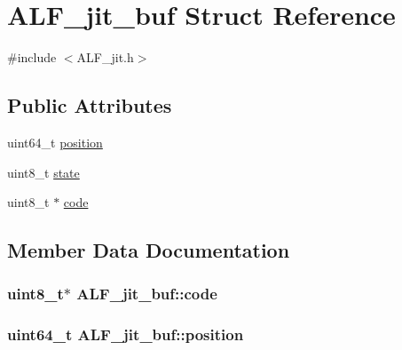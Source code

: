 \hypertarget{structALF__jit__buf}{}\section{A\+L\+F\+\_\+jit\+\_\+buf Struct Reference}
\label{structALF__jit__buf}


{\ttfamily \#include $<$A\+L\+F\+\_\+jit.\+h$>$}

\subsection*{Public Attributes}
\begin{DoxyCompactItemize}
\item 
uint64\+\_\+t \hyperlink{structALF__jit__buf_a6a35d3d3e3a0033c118119bdec30df10}{position}
\item 
uint8\+\_\+t \hyperlink{structALF__jit__buf_a6c8c4d0af0f8cc06d141f6babe8236b6}{state}
\item 
uint8\+\_\+t $\ast$ \hyperlink{structALF__jit__buf_acc94d6814de68a2c11e60ea2ae924385}{code}
\end{DoxyCompactItemize}


\subsection{Member Data Documentation}
\subsubsection[{\texorpdfstring{code}{code}}]{\setlength{\rightskip}{0pt plus 5cm}uint8\+\_\+t$\ast$ A\+L\+F\+\_\+jit\+\_\+buf\+::code}\hypertarget{structALF__jit__buf_acc94d6814de68a2c11e60ea2ae924385}{}\label{structALF__jit__buf_acc94d6814de68a2c11e60ea2ae924385}
\subsubsection[{\texorpdfstring{position}{position}}]{\setlength{\rightskip}{0pt plus 5cm}uint64\+\_\+t A\+L\+F\+\_\+jit\+\_\+buf\+::position}\hypertarget{structALF__jit__buf_a6a35d3d3e3a0033c118119bdec30df10}{}\label{structALF__jit__buf_a6a35d3d3e3a0033c118119bdec30df10}
